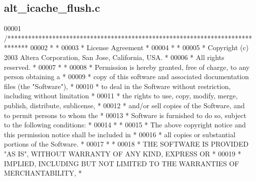 \subsection{alt\+\_\+icache\+\_\+flush.\+c}
\label{alt__icache__flush_8c_source}

\begin{DoxyCode}
00001 \textcolor{comment}{/******************************************************************************}
00002 \textcolor{comment}{*                                                                             *}
00003 \textcolor{comment}{* License Agreement                                                           *}
00004 \textcolor{comment}{*                                                                             *}
00005 \textcolor{comment}{* Copyright (c) 2003 Altera Corporation, San Jose, California, USA.           *}
00006 \textcolor{comment}{* All rights reserved.                                                        *}
00007 \textcolor{comment}{*                                                                             *}
00008 \textcolor{comment}{* Permission is hereby granted, free of charge, to any person obtaining a     *}
00009 \textcolor{comment}{* copy of this software and associated documentation files (the "Software"),  *}
00010 \textcolor{comment}{* to deal in the Software without restriction, including without limitation   *}
00011 \textcolor{comment}{* the rights to use, copy, modify, merge, publish, distribute, sublicense,    *}
00012 \textcolor{comment}{* and/or sell copies of the Software, and to permit persons to whom the       *}
00013 \textcolor{comment}{* Software is furnished to do so, subject to the following conditions:        *}
00014 \textcolor{comment}{*                                                                             *}
00015 \textcolor{comment}{* The above copyright notice and this permission notice shall be included in  *}
00016 \textcolor{comment}{* all copies or substantial portions of the Software.                         *}
00017 \textcolor{comment}{*                                                                             *}
00018 \textcolor{comment}{* THE SOFTWARE IS PROVIDED "AS IS", WITHOUT WARRANTY OF ANY KIND, EXPRESS OR  *}
00019 \textcolor{comment}{* IMPLIED, INCLUDING BUT NOT LIMITED TO THE WARRANTIES OF MERCHANTABILITY,    *}

\end{DoxyCode}
